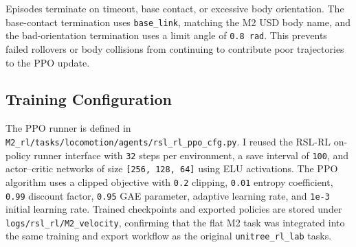 Episodes terminate on timeout, base contact, or excessive body orientation. The base-contact termination
uses \texttt{base\_link}, matching the M2 USD body name, and the bad-orientation termination uses a
limit angle of \texttt{0.8 rad}. This prevents failed rollovers or body collisions from continuing to
contribute poor trajectories to the PPO update.

\subsection{Training Configuration}

The PPO runner is defined in
\texttt{M2\_rl/tasks/locomotion/agents/rsl\_rl\_ppo\_cfg.py}. I reused the RSL-RL on-policy runner
interface with \texttt{32} steps per environment, a save interval of \texttt{100}, and actor--critic
networks of size \texttt{[256, 128, 64]} using ELU activations. The PPO algorithm uses a clipped objective
with \texttt{0.2} clipping, \texttt{0.01} entropy coefficient, \texttt{0.99} discount factor,
\texttt{0.95} GAE parameter, adaptive learning rate, and \texttt{1e-3} initial learning rate. Trained
checkpoints and exported policies are stored under \texttt{logs/rsl\_rl/M2\_velocity}, confirming that
the flat M2 task was integrated into the same training and export workflow as the original
\texttt{unitree\_rl\_lab} tasks.

